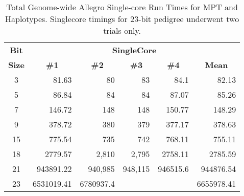 \begin{table}[h]
\begin{center}
\begin{tabular}{crrrrr}\toprule
\textbf{Bit}  & \multicolumn{5}{c}{\textbf{SingleCore}}                                                                                                                                       \\
\textbf{Size} & \multicolumn{1}{c}{\textbf{\#1}} & \multicolumn{1}{c}{\textbf{\#2}} & \multicolumn{1}{c}{\textbf{\#3}} & \multicolumn{1}{c}{\textbf{\#4}} & \multicolumn{1}{c}{\textbf{Mean}} \\
\midrule
3             & 81.63                            & 80                               & 83                               & 84.1                             & 82.13                             \\
5             & 86.84                            & 84                               & 84                               & 87.07                            & 85.26                             \\
7             & 146.72                           & 148                              & 148                              & 150.77                           & 148.29                            \\
9             & 378.72                           & 380                              & 379                              & 377.17                           & 378.63                            \\
15            & 775.54                           & 735                              & 742                              & 768.11                           & 755.11                            \\
18            & 2779.57                          & 2,810                            & 2,795                            & 2758.11                          & 2785.59                           \\
21            & 943891.22                        & 940,985                          & 948,115                          & 946515.6                         & 944876.54                         \\
23            & 6531019.41                       & 6780937.4                        &                                  &                                  & 6655978.41                       \\
\hline
\end{tabular}
\end{center}
\vspace{-15pt}
\caption{Total Genome-wide Allegro Single-core Run Times for MPT and Haplotypes. Singlecore timings for 23-bit pedigree underwent two trials only.}\label{table:res:allegrosingleruntimes}
\end{table}


